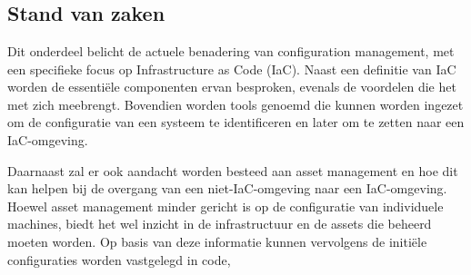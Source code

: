 
\chapter{}%
\label{ch:methodologie}


\section{Stand van zaken}
\label{sec:stand-van-zaken}
Dit onderdeel belicht de actuele benadering van configuration management, met een specifieke focus op Infrastructure as Code (IaC).
Naast een definitie van IaC worden de essenti\"ele componenten ervan besproken, evenals de voordelen die het met zich meebrengt.
Bovendien worden tools genoemd die kunnen worden ingezet om de configuratie van een systeem te identificeren en later om te zetten naar een IaC-omgeving.

Daarnaast zal er ook aandacht worden besteed aan asset management en hoe dit kan helpen bij de overgang van een niet-IaC-omgeving naar een IaC-omgeving.
Hoewel asset management minder gericht is op de configuratie van individuele machines, biedt het wel inzicht in de infrastructuur en de assets die beheerd moeten worden.
Op basis van deze informatie kunnen vervolgens de initi\"ele configuraties worden vastgelegd in code,

